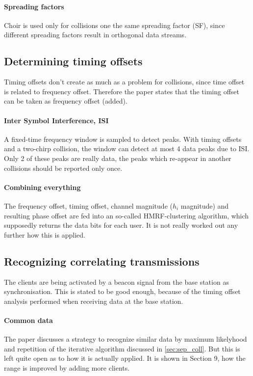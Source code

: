 \documentclass[a4paper,journal]{IEEEtran_custom}
\begin{document}
\paragraph{Spreading factors} Choir is used only for collisions one the same spreading factor (SF), since different spreading factors result in orthogonal data streams.

\subsection{Determining timing offsets}
Timing offsets don't create as much as a problem for collisions, since time offset is related to frequency offset. Therefore the paper states that the timing offset can be taken as frequency offset (added).
\paragraph{Inter Symbol Interference, ISI} A fixed-time frequency window is sampled to detect peaks. With timing offsets and a two-chirp collision, the window can detect at most 4 data peaks due to ISI. Only 2 of these peaks are really data, the peaks which re-appear in another collisions should be reported only once. 
\paragraph{Combining everything} The frequency offset, timing offset, channel magnitude ($h_i$ magnitude) and resulting phase offset are fed into an so-called HMRF-clustering algorithm, which supposedly returns the data bits for each user. It is not really worked out any further how this is applied.

\subsection{Recognizing correlating transmissions}
The clients are being activated by a beacon signal from the base station as synchronisation. This is stated to be good enough, because of the timing offset analysis performed when receiving data at the base station.
\paragraph{Common data} The paper discusses a strategy to recognize similar data by maximum likelyhood and repetition of the iterative algorithm discussed in \ref{sec:sep_coll}. But this is left quite open as to how it is actually applied. It is shown in Section 9, how the range is improved by adding more clients.
\end{document}

